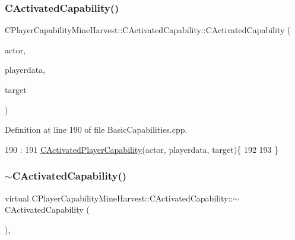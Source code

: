 \subsubsection{\texorpdfstring{C\+Activated\+Capability()}{CActivatedCapability()}}
{\footnotesize\ttfamily C\+Player\+Capability\+Mine\+Harvest\+::\+C\+Activated\+Capability\+::\+C\+Activated\+Capability (\begin{DoxyParamCaption}\item[{std\+::shared\+\_\+ptr$<$ \hyperlink{classCPlayerAsset}{C\+Player\+Asset} $>$}]{actor,  }\item[{std\+::shared\+\_\+ptr$<$ \hyperlink{classCPlayerData}{C\+Player\+Data} $>$}]{playerdata,  }\item[{std\+::shared\+\_\+ptr$<$ \hyperlink{classCPlayerAsset}{C\+Player\+Asset} $>$}]{target }\end{DoxyParamCaption})}



Definition at line 190 of file Basic\+Capabilities.\+cpp.


\begin{DoxyCode}
190                                                                                                            
                                                                                    :
191 \hyperlink{classCActivatedPlayerCapability_a1ece00ffb6a7b925c84dd94a7407a0d1}{CActivatedPlayerCapability}(actor, playerdata, target)\{
192 
193 \}
\end{DoxyCode}
\hypertarget{classCPlayerCapabilityMineHarvest_1_1CActivatedCapability_a206562e670341a6eb24d0c5dc1bea976}{}\label{classCPlayerCapabilityMineHarvest_1_1CActivatedCapability_a206562e670341a6eb24d0c5dc1bea976} 
\subsubsection{\texorpdfstring{$\sim$\+C\+Activated\+Capability()}{~CActivatedCapability()}}
{\footnotesize\ttfamily virtual C\+Player\+Capability\+Mine\+Harvest\+::\+C\+Activated\+Capability\+::$\sim$\+C\+Activated\+Capability (\begin{DoxyParamCaption}{ }\end{DoxyParamCaption})\hspace{0.3cm}{\ttfamily [inline]}, {\ttfamily [virtual]}}



